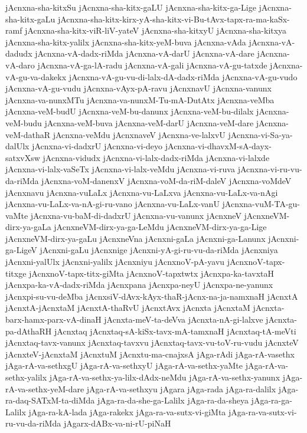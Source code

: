 {jAcnxna-sha-kitxSu
jAcnxna-sha-kitx-gaLU
jAcnxna-sha-kitx-ga-Lige
jAcnxna-sha-kitx-gaLu
jAcnxna-sha-kitx-kirx-yA-sha-kitx-vi-Bu-tAvx-tapx-ra-ma-kaSx-ramf
jAcnxna-sha-kitx-viR-liV-yateV
jAcnxna-sha-kitxyU
jAcnxna-sha-kitxya
jAcnxna-sha-kitx-yalilx
jAcnxna-sha-kitx-yeM-buva
jAcnxna-vAda
jAcnxna-vA-dadudx
jAcnxna-vA-dadx-riMda
jAcnxna-vA-darU
jAcnxna-vA-dare
jAcnxna-vA-daro
jAcnxna-vA-ga-lA-radu
jAcnxna-vA-gali
jAcnxna-vA-gu-tatxde
jAcnxna-vA-gu-va-dakekx
jAcnxna-vA-gu-vu-di-lalx-dA-dadx-riMda
jAcnxna-vA-gu-vudo
jAcnxna-vA-gu-vudu
jAcnxna-vAyx-pA-ravu
jAcnxnavU
jAcnxna-vanunx
jAcnxna-va-nunxMTu
jAcnxna-va-nunxM-Tu-mA-DutAtx
jAcnxna-veMba
jAcnxna-veM-budU
jAcnxna-veM-bu-danunx
jAcnxna-veM-bu-dilalx
jAcnxna-veM-budu
jAcnxna-veM-buva
jAcnxna-veM-darU
jAcnxna-veM-dare
jAcnxna-veM-dathaR
jAcnxna-veMdu
jAcnxnaveV
jAcnxna-ve-lalxvU
jAcnxna-vi-Sa-ya-dalUlx
jAcnxna-vi-dadxrU
jAcnxna-vi-deyo
jAcnxna-vi-dhavxM-sA-dayx-satxvXsw
jAcnxna-vidudx
jAcnxna-vi-lalx-dadx-riMda
jAcnxna-vi-lalxde
jAcnxna-vi-lalx-vaSeTx
jAcnxna-vi-lalx-veMdu
jAcnxna-vi-ruva
jAcnxna-vi-ru-vu-da-riMda
jAcnxna-voM-danenxV
jAcnxna-voM-da-riM-daleV
jAcnxna-voMdeV
jAcnxnavu
jAcnxna-vuLaLx
jAcnxna-vu-LaLxva
jAcnxna-vu-LaLx-va-nAgi
jAcnxna-vu-LaLx-va-nA-gi-ru-vano
jAcnxna-vu-LaLx-vanU
jAcnxna-vuM-TA-gu-vaMte
jAcnxna-vu-baM-di-dadxrU
jAcnxna-vu-vanunx
jAcnxneV
jAcnxneVM-dirx-ya-gaLa
jAcnxneVM-dirx-ya-ga-LeMdu
jAcnxneVM-dirx-ya-ga-Lige
jAcnxneVM-dirx-ya-gaLu
jAcnxneVna
jAcnxni-gaLa
jAcnxni-ga-Lanunx
jAcnxni-ga-LigeV
jAcnxni-gaLu
jAcnxnige
jAcnxni-yA-gi-ru-vu-da-riMda
jAcnxniya
jAcnxni-yalUlx
jAcnxni-yalilx
jAcnxniyu
jAcnxnoV-pA-yavu
jAcnxnoV-tapx-titxge
jAcnxnoV-tapx-titx-giMta
jAcnxnoV-tapxtwtx
jAcnxpa-ka-tavxtaH
jAcnxpa-ka-vA-dadx-riMda
jAcnxpana
jAcnxpa-neyU
jAcnxpa-ne-yanunx
jAcnxpi-su-vu-deMba
jAcnxsiV-dAvx-kAyx-thaR-jAcnx-na-ja-namxnaH
jAcnxtA
jAcnxtA-jAcnxtaM
jAcnxtA-thaRvU
jAcnxtAvx
jAcnxta
jAcnxtaM
jAcnxta-barx-hamx-parx-vA-dinaH
jAcnxta-meV-ta-deVva
jAcnxta-nA-gi-lalxve
jAcnxta-pa-dAthaRH
jAcnxtaq
jAcnxtaq-sA-kiSx-tavx-mA-tamxnaH
jAcnxtaq-tA-meVti
jAcnxtaq-tavx-vanunx
jAcnxtaq-tavxvu
jAcnxtaq-tavx-vu-toV-ru-vudu
jAcnxteV
jAcnxteV-jAcnxtaM
jAcnxtuM
jAcnxtu-ma-cnajxsA
jAga-rAdi
jAga-rA-vasethx
jAga-rA-va-sethxgU
jAga-rA-va-sethxyU
jAga-rA-va-sethx-yaMte
jAga-rA-va-sethx-yalilx
jAga-rA-va-sethx-ya-lilx-dAdx-neMdu
jAga-rA-va-sethx-yanunx
jAga-rA-va-sethx-yeM-dare
jAga-rA-va-sethxyu
jAgara
jAga-rada
jAga-ra-dalilx
jAga-ra-daq-SATxM-ta-diMda
jAga-ra-da-she-ga-Lalilx
jAga-ra-da-sheya
jAga-ra-ga-Lalilx
jAga-ra-kA-lada
jAga-rakekx
jAga-ra-va-sutx-vi-giMta
jAga-ra-va-sutx-vi-ru-vu-da-riMda
jAgarx-dABx-va-ni-rU-piNaH
}
